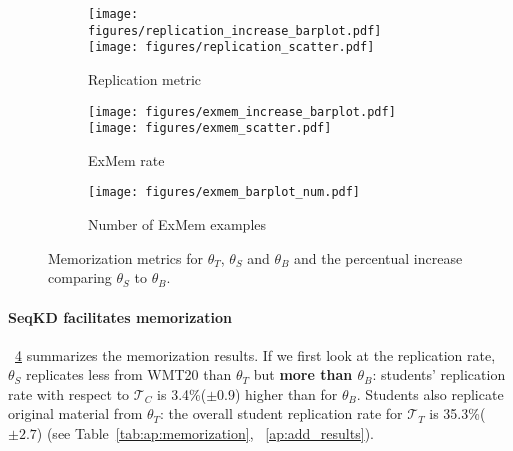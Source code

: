 \begin{figure}[!t]
    \centering
    \begin{subfigure}[b]{0.49\columnwidth}
        \texttt{[image: figures/replication\_increase\_barplot.pdf]}
        \texttt{[image: figures/replication\_scatter.pdf]}
        \caption{Replication metric}
        \label{fig:mem-metrics-replication}
    \end{subfigure}
    \begin{subfigure}[b]{0.49\columnwidth}
        \texttt{[image: figures/exmem\_increase\_barplot.pdf]}
        \texttt{[image: figures/exmem\_scatter.pdf]}
        \caption{ExMem rate}
        \label{fig:mem-metrics-exmem}
    \end{subfigure}
    \begin{subfigure}[b]{\columnwidth}\centering
        \texttt{[image: figures/exmem\_barplot\_num.pdf]}
        \caption{Number of ExMem examples}
        \label{fig:exmem_numbers}
    \end{subfigure}
    \caption{Memorization metrics for $\theta_T$, $\theta_S$ and $\theta_B$ and the percentual increase comparing $\theta_S$ to $\theta_B$.}
    \label{fig:mem-metrics}
\end{figure}


\paragraph{SeqKD facilitates memorization}
\figureshortcut~\ref{fig:mem-metrics} summarizes the memorization results.
If we first look at the replication rate, $\theta_S$ replicates less from WMT20 than $\theta_T$ but \textbf{more than $\theta_B$}: students' replication rate with respect to $\mathcal{T}_C$ is 3.4\%($\pm$0.9) higher than for $\theta_B$.
Students also replicate original material from $\theta_T$: the overall student replication rate for $\mathcal{T}_T$ is 35.3\%($\pm2.7$) (see Table~\ref{tab:ap:memorization}, \appendixshortcut~\ref{ap:add_results}).

